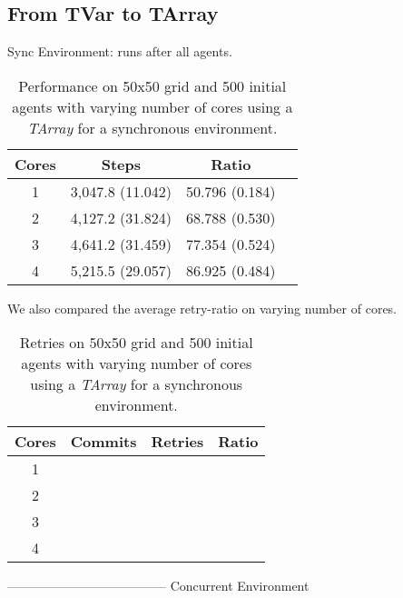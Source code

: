 \subsection{From TVar to TArray}
Sync Environment: runs after all agents.

\begin{table}
	\centering
  	\begin{tabular}{ c || c | c | c }
        Cores & Steps            & Ratio          \\ \hline \hline 
    	1     & 3,047.8 (11.042) & 50.796 (0.184) \\ \hline
   		2     & 4,127.2 (31.824) & 68.788 (0.530) \\ \hline
   		3     & 4,641.2 (31.459) & 77.354 (0.524) \\ \hline
   		4     & 5,215.5 (29.057) & 86.925 (0.484) \\ \hline \hline
   	\end{tabular}
  	
  	\caption{Performance on 50x50 grid and 500 initial agents with varying number of cores using a \textit{TArray} for a synchronous environment.}
	\label{tab:tarray_results_syncenv_time}
\end{table}

We also compared the average retry-ratio on varying number of cores.

\begin{table}
	\centering
  	\begin{tabular}{ c || c | c | c }
        Cores & Commits           & Retries            & Ratio \\ \hline \hline 
    	1     &                   &                    &  \\ \hline
   		2     &                   &                    &  \\ \hline
   		3     &                   &                    &  \\ \hline
   		4     &                   &                    &  \\ \hline
   	\end{tabular}
  	
  	\caption{Retries on 50x50 grid and 500 initial agents with varying number of cores using a \textit{TArray} for a synchronous environment.}
	\label{tab:tarray_results_syncenv_retries}
\end{table}

--------------------------------------
Concurrent Environment

